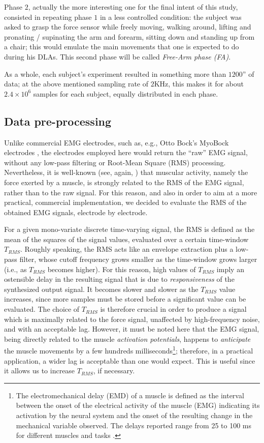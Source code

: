 Phase $2$, actually the more interesting one for the final intent of
this study, consisted in repeating phase $1$ in a less controlled
condition: the subject was asked to grasp the force sensor while
freely moving, walking around, lifting and pronating / supinating the
arm and forearm, sitting down and standing up from a chair; this would
emulate the main movements that one is expected to do during his DLAs.
This second phase will be called \emph{Free-Arm phase (FA)}.

As a whole, each subject's experiment resulted in something more than
$1200$'' of data; at the above mentioned sampling rate of $2$KHz, this
makes it for about $2.4\times 10^6$ samples for each subject, equally
distributed in each phase.

\subsection{Data pre-processing}

Unlike commercial EMG electrodes, such as, e.g., Otto Bock's MyoBock
electrodes \cite{ottobock}, the electrodes employed here would return
the ``raw'' EMG signal, without any low-pass filtering or Root-Mean
Square (RMS) processing. Nevertheless, it is well-known (see, again,
\cite{deluca,zecca}) that muscular activity, namely the force exerted
by a muscle, is strongly related to the RMS of the EMG signal, rather
than to the raw signal. For this reason, and also in order to aim at a
more practical, commercial implementation, we decided to evaluate the
RMS of the obtained EMG signals, electrode by electrode.

For a given mono-variate discrete time-varying signal, the RMS is
defined as the mean of the squares of the signal values, evaluated
over a certain time-window $T_{RMS}$. Roughly speaking, the RMS acts
like an envelope extraction plus a low-pass filter, whose cutoff
frequency grows smaller as the time-window grows larger (i.e., as
$T_{RMS}$ becomes higher). For this reason, high values of $T_{RMS}$
imply an ostensible delay in the resulting signal that is due to
\emph{responsiveness} of the synthesized output signal. It becomes
slower and slower as the $T_{RMS}$ value increases, since more samples
must be stored before a significant value can be evaluated.  The
choice of $T_{RMS}$ is therefore crucial in order to produce a signal
which is maximally related to the force signal, unaffected by
high-frequency noise, and with an acceptable lag. However, it must be
noted here that the EMG signal, being directly related to the muscle
\emph{activation potentials}, happens to \emph{anticipate} the muscle
movements by a few hundreds milliseconds\footnote{The
electromechanical delay (EMD) of a muscle is defined as the interval
between the onset of the electrical activity of the muscle (EMG)
indicating its activation by the neural system and the onset of the
resulting change in the mechanical variable observed. The delays
reported range from 25 to 100 ms for different muscles and tasks
\cite{Wolf1994}.}; therefore, in a practical application, a wider lag
is acceptable than one would expect. This is useful since it allows us
to increase $T_{RMS}$, if necessary.


